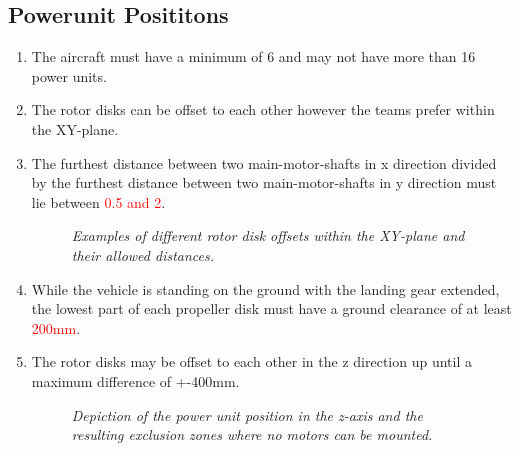 \documentclass{article}
\begin{document}
\subsection{Powerunit Posititons}
\begin{enumerate}
  \item The aircraft must have a minimum of 6 and may not have more than 16 power units. 
  \item The rotor disks can be offset to each other however the teams prefer within the XY-plane. 
  \item The furthest distance between two main-motor-shafts in x direction divided by the furthest distance between two main-motor-shafts in y direction must lie between \textcolor{red}{0.5 and 2}. 
  
  \begin{figure}[h!]
    \centering
   \caption{\textit{Examples of different rotor disk offsets within the XY-plane and their allowed distances.}}
   \end{figure}

  \item While the vehicle is standing on the ground with the landing gear extended, the lowest part of each propeller disk must have a ground clearance of at least \textcolor{red}{200mm}. 
  \item The rotor disks may be offset to each other in the z direction up until a maximum difference of +-400mm.
  
  \begin{figure}[h!]
    \centering
   \caption{\textit{Depiction of the power unit position in the z-axis and the resulting exclusion zones where no motors can be mounted.}}
   \end{figure}


\end{enumerate}
\end{document}
